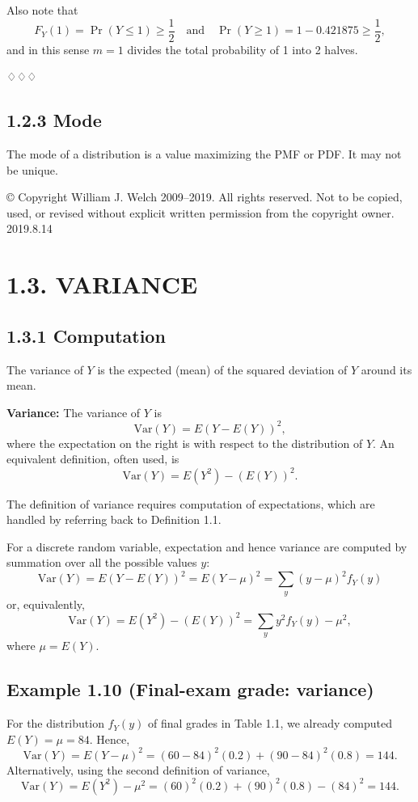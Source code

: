 Also note that 
\[
F_Y(1) = \Pr(Y \leq 1) \geq \frac{1}{2} \quad \text{and} \quad \Pr(Y \geq 1) = 1 - 0.421875 \geq \frac{1}{2}, 
\]
and in this sense $m = 1$ divides the total probability of 1 into 2 halves. 

♢♢♢

\subsection{1.2.3 Mode}
The mode of a distribution is a value maximizing the PMF or PDF. It may not be unique.

© Copyright William J. Welch 2009--2019. All rights reserved. Not to be copied, used, or revised without explicit written permission from the copyright owner. 2019.8.14

\section{1.3. VARIANCE}
\subsection{1.3.1 Computation}
The variance of $Y$ is the expected (mean) of the squared deviation of $Y$ around its mean. 

\begin{definition}
\textbf{Variance:} The variance of $Y$ is 
\[
\text{Var}(Y) = E (Y - E(Y))^2, 
\]
where the expectation on the right is with respect to the distribution of $Y$. An equivalent definition, often used, is 
\[
\text{Var}(Y) = E(Y^2) - (E(Y))^2. 
\]
\end{definition}
The definition of variance requires computation of expectations, which are handled by referring back to Definition 1.1. 

For a discrete random variable, expectation and hence variance are computed by summation over all the possible values $y$:
\[
\text{Var}(Y) = E (Y - E(Y))^2 = E (Y - \mu)^2 = \sum_y (y - \mu)^2 f_Y(y)
\]
or, equivalently,
\[
\text{Var}(Y) = E(Y^2) - (E(Y))^2 = \sum_y y^2 f_Y(y) - \mu^2,
\]
where $\mu = E(Y)$.

\subsection{Example 1.10 (Final-exam grade: variance)}
For the distribution $f_Y(y)$ of final grades in Table 1.1, we already computed $E(Y) = \mu = 84$. Hence,
\[
\text{Var}(Y) = E (Y - \mu)^2 = (60 - 84)^2 (0.2) + (90 - 84)^2 (0.8) = 144.
\]
Alternatively, using the second definition of variance,
\[
\text{Var}(Y) = E(Y^2) - \mu^2 = (60)^2(0.2) + (90)^2(0.8) - (84)^2 = 144.
\]

